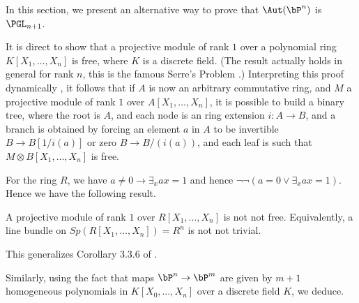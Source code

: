 In this section, we present an alternative way to prove that   $\Aut(\bP^n)$ is $\PGL_{n+1}$.

It is direct \cite{seminormal} to show that a projective module of rank $1$ over a polynomial
ring $K[X_1,\dots,X_n]$ is free, where $K$ is a discrete field. (The result actually holds in general
for rank $n$, this is the famous Serre's Problem \cite{lam}.) Interpreting this proof dynamically
\cite{lombardi-quitte}, it follows that if $A$ is now an arbitrary commutative ring, and $M$ a
projective module of rank $1$ over $A[X_1,\dots,X_n]$, it is possible to build a binary tree, where
the root is $A$, and each node is an ring extension $i:A\rightarrow B$, and a branch is obtained
by forcing an element $a$ in $A$ to be invertible $B\rightarrow B[1/i(a)]$ or zero $B\rightarrow B/(i(a))$,
and each leaf is such that $M\otimes B[X_1,\dots,X_n]$ is free.

For the ring $R$, we have $a\neq 0\rightarrow \exists_x ax=1$ and hence $\neg \neg (a=0\vee \exists_x a x=1)$.
Hence we have the following result.

\begin{lemma}\label{notnot}
  A projective module of rank $1$ over $R[X_1,\dots,X_n]$ is not not free. Equivalently, 
a line bundle on $Sp(R[X_1,\dots,X_n]) = R^n$ is not not trivial.
\end{lemma}

This generalizes Corollary 3.3.6 of \cite{draft}.



Similarly, using the fact that maps $\bP^n\rightarrow \bP^m$ are given by $m+1$ homogeneous polynomials in $K[X_0,\dots,X_n]$
over a discrete field $K$, we deduce.

